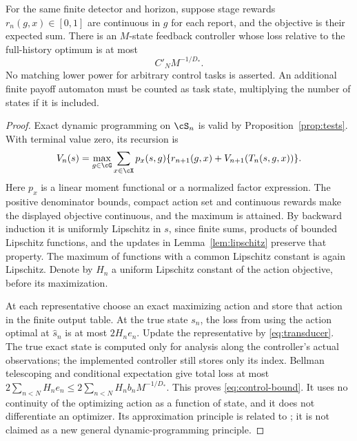 \begin{theorem}\label{thm:control-bound}
For the same finite detector and horizon, suppose stage rewards
$r_n(g,x)\in[0,1]$ are continuous in $g$ for each report, and the objective
is their expected sum. There is an $M$-state feedback controller whose
loss relative to the full-history optimum is at most
\begin{equation}\label{eq:control-bound}
 C'_N M^{-1/D_*}.
\end{equation}
No matching lower power for arbitrary control tasks is asserted. An
additional finite payoff automaton must be counted as task state, multiplying
the number of states if it is included.
\end{theorem}
\begin{proof}
Exact dynamic programming on $\cS_n$ is valid by
Proposition~\ref{prop:tests}. With terminal value zero, its recursion is
\[
 V_n(s)=\max_{g\in\cG}\sum_{x\in\cX}p_x(s,g)
       \{r_{n+1}(g,x)+V_{n+1}(T_n(s,g,x))\}.
\]
Here $p_x$ is a linear moment functional or a normalized factor expression.
The positive denominator bounds, compact action set and continuous rewards
make the displayed objective continuous, and the maximum is attained.
By backward induction it is uniformly Lipschitz in $s$, since finite sums,
products of bounded Lipschitz functions, and the updates in
Lemma~\ref{lem:lipschitz} preserve that property. The maximum of functions
with a common Lipschitz constant is again Lipschitz. Denote by $H_n$ a
uniform Lipschitz constant of the action objective, before its maximization.

At each representative choose an exact maximizing action and store that
action in the finite output table. At the true state $s_n$, the loss from
using the action optimal at $\widehat s_n$ is at most $2H_ne_n$.
Update the representative by \eqref{eq:transducer}. The true exact state
is computed only for analysis along the controller's actual observations;
the implemented controller still stores only its index. Bellman telescoping
and conditional expectation give total loss at most
$2\sum_{n<N}H_ne_n\le2\sum_{n<N}H_nb_n M^{-1/D_*}$.
This proves \eqref{eq:control-bound}. It uses no continuity of the optimizing
action as a function of state, and it does not differentiate an optimizer.
Its approximation principle is related to \cite{Subramanian}; it is not
claimed as a new general dynamic-programming principle.
\end{proof}

